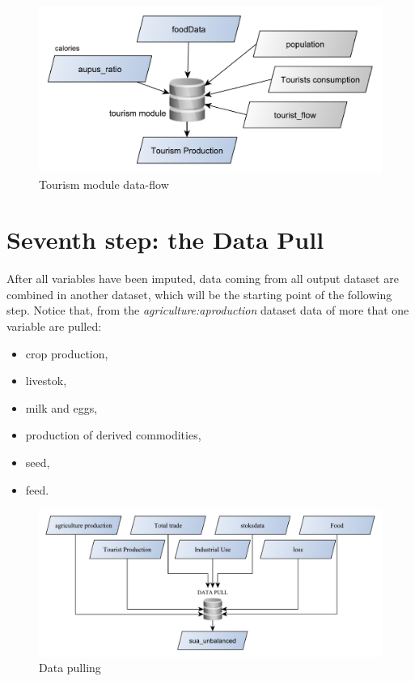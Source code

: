 \documentclass[]{article}
\providecommand{\tightlist}{%
  \setlength{\itemsep}{0pt}\setlength{\parskip}{0pt}}
\begin{document}
\begin{figure}[H]

{\centering \includegraphics[width=0.6\linewidth]{images/SwsFbs/16_tourism} 

}

\caption{\label{fig:f16}Tourism module data-flow}\label{fig:f16}
\end{figure}

\section{Seventh step: the Data Pull}\label{seventh-step-the-data-pull}

After all variables have been imputed, data coming from all output
dataset are combined in another dataset, which will be the starting
point of the following step. Notice that, from the
\emph{agriculture:aproduction} dataset data of more that one variable
are pulled:

\begin{itemize}
\tightlist
\item
  crop production,
\item
  livestok,
\item
  milk and eggs,
\item
  production of derived commodities,
\item
  seed,
\item
  feed.
\end{itemize}

\begin{figure}[H]

{\centering \includegraphics[width=0.9\linewidth]{images/SwsFbs/17_pulldata} 

}

\caption{\label{fig:f17}Data pulling}\label{fig:f17}
\end{figure}
\end{document}
